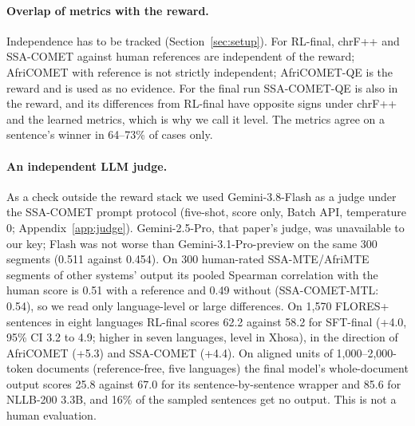 \paragraph{Overlap of metrics with the reward.} Independence has to be tracked (Section~\ref{sec:setup}). For RL-final, chrF++ and SSA-COMET against human references are independent of the reward; AfriCOMET with reference is not strictly independent; AfriCOMET-QE is the reward and is used as no evidence. For the final run SSA-COMET-QE is also in the reward, and its differences from RL-final have opposite signs under chrF++ and the learned metrics, which is why we call it level. The metrics agree on a sentence's winner in 64--73\% of cases only.

\paragraph{An independent LLM judge.} As a check outside the reward stack we used Gemini-3.8-Flash as a judge under the SSA-COMET prompt protocol \citep{li2025ssacomet} (five-shot, score only, Batch API, temperature 0; Appendix~\ref{app:judge}). Gemini-2.5-Pro, that paper's judge, was unavailable to our key; Flash was not worse than Gemini-3.1-Pro-preview on the same 300 segments (0.511 against 0.454). On 300 human-rated SSA-MTE/AfriMTE segments of other systems' output its pooled Spearman correlation with the human score is 0.51 with a reference and 0.49 without (SSA-COMET-MTL: 0.54), so we read only language-level or large differences. On 1,570 FLORES+ sentences in eight languages RL-final scores 62.2 against 58.2 for SFT-final (+4.0, 95\% CI 3.2 to 4.9; higher in seven languages, level in Xhosa), in the direction of AfriCOMET (+5.3) and SSA-COMET (+4.4). On aligned units of 1,000--2,000-token documents (reference-free, five languages) the final model's whole-document output scores 25.8 against 67.0 for its sentence-by-sentence wrapper and 85.6 for NLLB-200 3.3B, and 16\% of the sampled sentences get no output. This is not a human evaluation.
